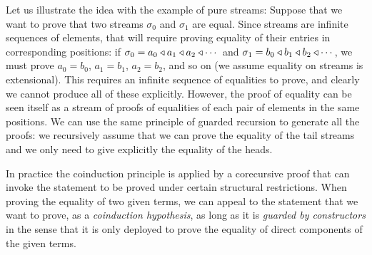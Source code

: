 Let us illustrate the idea with the example of pure streams:
Suppose that we want to prove that two streams $\sigma_0$ and $\sigma_1$ are equal.
Since streams are infinite sequences of elements, that will require proving equality of their entries in corresponding positions: if $\sigma_0 = a_0\triangleleft a_1\triangleleft a_2\triangleleft \cdots$ and  $\sigma_1 = b_0\triangleleft b_1\triangleleft b_2\triangleleft \cdots$, we must prove $a_0 = b_0$, $a_1 = b_1$, $a_2=b_2$, and so on (we assume equality on streams is extensional).
This requires an infinite sequence of equalities to prove, and clearly we cannot produce all of these explicitly.
However, the proof of equality can be seen itself as a stream of proofs of equalities of each pair of elements in the same positions.
We can use the same principle of guarded recursion to generate all the proofs: we recursively assume that we can prove the equality of the tail streams and we only need to give explicitly the equality of the heads.

In practice the coinduction principle is applied by a corecursive proof that can invoke the statement to be proved under certain structural restrictions.
When proving the equality of two given terms, we can appeal to the statement that we want to prove, as a {\em coinduction hypothesis}, as long as it is {\em guarded by constructors} in the sense that it is only deployed to prove the equality of direct components of the given terms.

